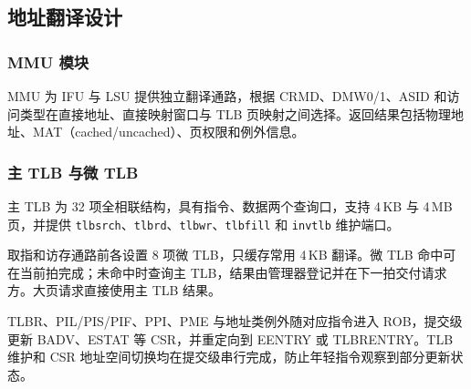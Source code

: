 \subsection{地址翻译设计}

\subsubsection{MMU 模块}

MMU 为 IFU 与 LSU 提供独立翻译通路，根据 CRMD、DMW0/1、ASID 和访问类型在直接地址、直接映射窗口与 TLB 页映射之间选择。返回结果包括物理地址、MAT（cached/uncached）、页权限和例外信息。

\subsubsection{主 TLB 与微 TLB}

主 TLB 为 32 项全相联结构，具有指令、数据两个查询口，支持 4\,KB 与 4\,MB 页，并提供 \texttt{tlbsrch}、\texttt{tlbrd}、\texttt{tlbwr}、\texttt{tlbfill} 和 \texttt{invtlb} 维护端口。

取指和访存通路前各设置 8 项微 TLB，只缓存常用 4\,KB 翻译。微 TLB 命中可在当前拍完成；未命中时查询主 TLB，结果由管理器登记并在下一拍交付请求方。大页请求直接使用主 TLB 结果。

TLBR、PIL/PIS/PIF、PPI、PME 与地址类例外随对应指令进入 ROB，提交级更新 BADV、ESTAT 等 CSR，并重定向到 EENTRY 或 TLBRENTRY。TLB 维护和 CSR 地址空间切换均在提交级串行完成，防止年轻指令观察到部分更新状态。

